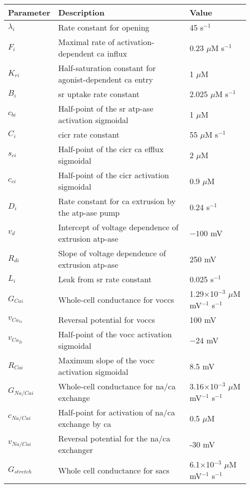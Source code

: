 \documentclass[11pt]{elsarticle}
\newcommand{\mus}{$\mu$M s$^{-1}$\xspace}
\newcommand{\uM}{$\mu$M\xspace}
\newcommand{\n}{$^{-1}$\xspace}
\newcommand{\psec}{s$^{-1}$\xspace}
\newcommand{\na}{\gls{na}\xspace}
\newcommand{\ca}{\gls{ca}\xspace}
\begin{document}
%
\xspace 
%
\begin{longtable}[h!]{ p{0.12\linewidth}   p{0.58\linewidth}   p{0.26\linewidth} }
	\hline
	Parameter & Description & Value \\
	\hline
$\lambda_{i} $				& Rate constant for opening											& 45 \psec \\
 $F_{i}$      			& Maximal rate of activation-dependent \ca influx			& 0.23 \mus	\\
$K_{ri}$				& Half-saturation constant for agonist-dependent \ca entry	& 1 \uM	\\
$B_{i}$      			& \gls{sr} uptake rate constant							& 2.025 \mus \\
$c_{bi}$				& Half-point of the \gls{sr} \gls{atp}-ase activation sigmoidal 	& 1 \uM \\
$C_{i}$      			& \gls{cicr} rate constant									& 55 \mus \\
$s_{ci}$				& Half-point of the \gls{cicr} \ca efflux sigmoidal			& 2 \uM\\
$c_{ci}$				& Half-point of the \gls{cicr} activation sigmoidal			& 0.9 \uM \\
$D_{i}$      			& Rate constant for \ca extrusion by the \gls{atp}-ase pump		 & 0.24	\psec \\
$v_{d}$					& Intercept of voltage dependence of extrusion \gls{atp}-ase			 & $-100$ mV \\
$R_{di}$				& Slope of voltage dependence of extrusion \gls{atp}-ase				 & 250 mV	 \\
$L_{i}$      			& Leak from \gls{sr} rate constant						 & 0.025 \psec	 \\
$G_{Cai}$ 	& Whole-cell conductance for \glspl{vocc}	 	& 1.29$\times$10$^{-3}$  \uM mV\n \psec	\\
$v_{Ca_{1i}}$   & Reversal potential for \glspl{vocc}	 						& 100  mV \\
$v_{Ca_{2i}}$  	& Half-point of the \gls{vocc} activation sigmoidal		 	& $-24$ mV	 \\
$R_{Cai}$      	& Maximum slope of the \gls{vocc}	activation sigmoidal		& 8.5 mV	 \\
$G_{Na/Cai}$   	& Whole-cell conductance for \na/\ca exchange & 3.16$\times$10$^{-3}$ \uM mV\n \psec \\
$c_{Na/Cai}$   	& Half-point for activation of \na/\ca exchange by \ca		 & 0.5 \uM	 \\
$v_{Na/Cai}$   	& Reversal potential for the \na/\ca exchanger					 & -30 mV	 \\
$G_{stretch}$      		& Whole cell conductance for \glspl{sac}						& 6.1$\times$10$^{-3}$ \uM mV\n \psec \\

\end{longtable}
\end{document}
